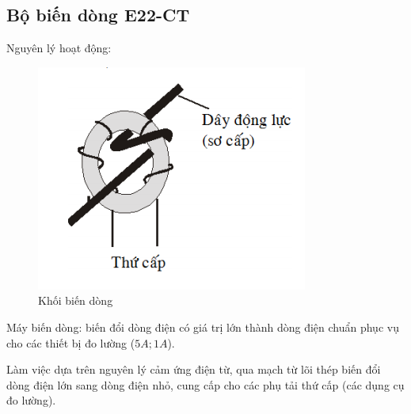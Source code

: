 \documentclass[13pt,a4paper]{extarticle}
\begin{document}
\subsection{Bộ biến dòng E22-CT}
Nguyên lý hoạt động:
\begin{figure}[!h]
\begin{center}
\includegraphics[scale=.7]{bien-dong}
\end{center}
\caption{Khối biến dòng}
\end{figure}
\begin{list}{--}{}
\item Máy biến dòng: biến đổi dòng điện có giá trị lớn thành dòng điện chuẩn phục vụ cho các thiết bị đo lường ($5A;1A$).
\item Làm việc dựa trên nguyên lý cảm ứng điện từ, qua mạch từ lõi thép biến đổi dòng điện lớn sang dòng điện nhỏ, cung cấp cho các phụ tải thứ cấp (các dụng cụ đo lường).
\end{list}
\end{document}
